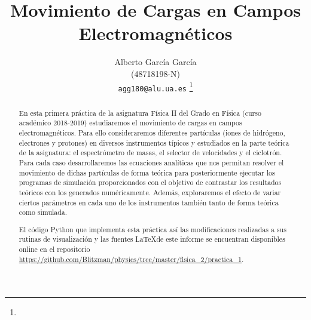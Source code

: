 \documentclass[journal]{IEEEtran}
\begin{document}
%
\title{Movimiento de Cargas en Campos Electromagnéticos}
%
%
%

\author{Alberto García García\\ (48718198-N)\\ \texttt{agg180@alu.ua.es} %
\thanks{}%
}


%
{}
% 


\maketitle

\begin{abstract}
En esta primera práctica de la asignatura Física II del Grado en Física (curso académico 2018-2019) estudiaremos el movimiento de cargas en campos electromagnéticos. Para ello consideraremos diferentes partículas (iones de hidrógeno, electrones y protones) en diversos instrumentos típicos y estudiados en la parte teórica de la asignatura: el espectrómetro de masas, el selector de velocidades y el ciclotrón. Para cada caso desarrollaremos las ecuaciones analíticas que nos permitan resolver el movimiento de dichas partículas de forma teórica para posteriormente ejecutar los programas de simulación proporcionados con el objetivo de contrastar los resultados teóricos con los generados numéricamente. Además, exploraremos el efecto de variar ciertos parámetros en cada uno de los instrumentos también tanto de forma teórica como simulada.

El código Python que implementa esta práctica así las modificaciones realizadas a sus rutinas de visualización y las fuentes \LaTeX de este informe se encuentran disponibles online en el repositorio \url{https://github.com/Blitzman/physics/tree/master/fisica_2/practica_1}.
\end{abstract}
\end{document}
